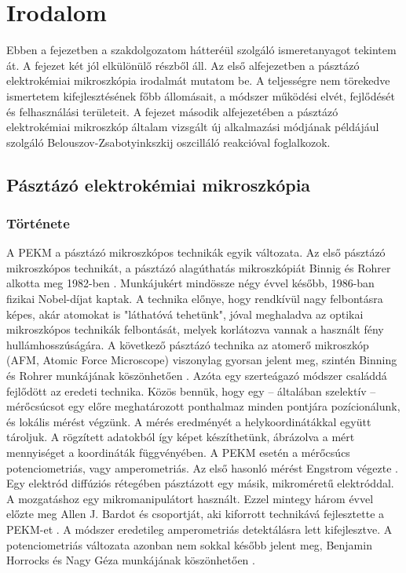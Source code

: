\chapter{Irodalom}
\pagestyle{headings}

Ebben a fejezetben a szakdolgozatom hátteréül szolgáló ismeretanyagot tekintem át. A fejezet két jól elkülönülő részből áll. Az első alfejezetben a pásztázó elektrokémiai mikroszkópia irodalmát mutatom be. A teljességre nem törekedve ismertetem kifejlesztésének főbb állomásait, a módszer működési elvét, fejlődését és felhasználási területeit. A fejezet második alfejezetében a pásztázó elektrokémiai mikroszkóp általam vizsgált új alkalmazási módjának példájául szolgáló Belouszov-Zsabotyinkszkij oszcilláló reakcióval foglalkozok. 

\section{Pásztázó elektrokémiai mikroszkópia}


\subsection{Története}

A PEKM a pásztázó mikroszkópos technikák egyik változata. Az első pásztázó mikroszkópos technikát, a pásztázó alagúthatás mikroszkópiát Binnig és Rohrer alkotta meg 1982-ben \cite{binnig1982surface}. Munkájukért mindössze négy évvel később, 1986-ban fizikai Nobel-díjat kaptak. A technika előnye, hogy rendkívül nagy felbontásra képes, akár atomokat is "láthatóvá tehetünk", jóval meghaladva az optikai mikroszkópos technikák felbontását, melyek korlátozva vannak a használt fény hullámhosszúságára. A következő pásztázó technika az atomerő mikroszkóp (AFM, Atomic Force Microscope) viszonylag gyorsan jelent meg, szintén Binning és Rohrer munkájának köszönhetően \cite{binnig1986atomic, bennig1988atomic}. Azóta egy szerteágazó módszer családdá fejlődött az eredeti technika. Közös bennük, hogy egy -- általában szelektív -- mérőcsúcsot egy előre meghatározott ponthalmaz minden pontjára pozícionálunk, és lokális mérést végzünk. A mérés eredményét a helykoordinátákkal együtt tároljuk. A rögzített adatokból így képet készíthetünk, ábrázolva a mért mennyiséget a koordináták függvényében. A PEKM esetén a mérőcsúcs potenciometriás, vagy amperometriás. Az első hasonló mérést Engstrom végezte \cite{engstrom1986measurements}. Egy elektród diffúziós rétegében pásztázott egy másik, mikroméretű elektróddal. A mozgatáshoz egy mikromanipulátort használt. Ezzel mintegy három évvel előzte meg Allen J. Bardot és csoportját, aki kiforrott technikává fejlesztette a PEKM-et \cite{bard1989scanning}. A módszer eredetileg amperometriás detektálásra lett kifejlesztve. A potenciometriás változata azonban nem sokkal később jelent meg, Benjamin Horrocks és Nagy Géza munkájának köszönhetően \cite{horrocks1993scanning}.

